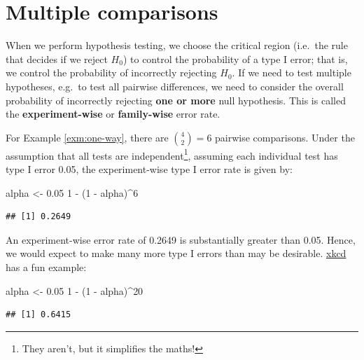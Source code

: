 \documentclass[
]{book}
\newenvironment{Shaded}{\begin{snugshade}}{\end{snugshade}}
\newcommand{\DecValTok}[1]{\textcolor[rgb]{0.00,0.00,0.81}{#1}}
\newcommand{\FloatTok}[1]{\textcolor[rgb]{0.00,0.00,0.81}{#1}}
\newcommand{\NormalTok}[1]{#1}
\newcommand{\OtherTok}[1]{\textcolor[rgb]{0.56,0.35,0.01}{#1}}
\newcommand{\SpecialCharTok}[1]{\textcolor[rgb]{0.00,0.00,0.00}{#1}}
\theoremstyle{definition}
\theoremstyle{definition}
\theoremstyle{definition}
\theoremstyle{definition}
\theoremstyle{remark}
\begin{document}
\hypertarget{multiple-comp}{%
\section{Multiple comparisons}\label{multiple-comp}}

When we perform hypothesis testing, we choose the critical region (i.e.~the rule that decides if we reject \(H_0\)) to control the probability of a type I error; that is, we control the probability of incorrectly rejecting \(H_0\). If we need to test multiple hypotheses, e.g.~to test all pairwise differences, we need to consider the overall probability of incorrectly rejecting \textbf{one or more} null hypothesis. This is called the \textbf{experiment-wise} or \textbf{family-wise} error rate.

For Example \ref{exm:one-way}, there are \({4 \choose 2} = 6\) pairwise comparisons. Under the assumption that all tests are independent\footnote{They aren't, but it simplifies the maths!}, assuming each individual test has type I error 0.05, the experiment-wise type I error rate is given by:

\begin{Shaded}
\begin{Highlighting}[]
\NormalTok{alpha }\OtherTok{\textless{}{-}} \FloatTok{0.05}
\DecValTok{1} \SpecialCharTok{{-}}\NormalTok{ (}\DecValTok{1} \SpecialCharTok{{-}}\NormalTok{ alpha)}\SpecialCharTok{\^{}}\DecValTok{6}
\end{Highlighting}
\end{Shaded}

\begin{verbatim}
## [1] 0.2649
\end{verbatim}

An experiment-wise error rate of 0.2649 is substantially greater than 0.05. Hence, we would expect to make many more type I errors than may be desirable. \href{https://xkcd.com/882}{xkcd} has a fun example:

\begin{Shaded}
\begin{Highlighting}[]
\NormalTok{alpha }\OtherTok{\textless{}{-}} \FloatTok{0.05}
\DecValTok{1} \SpecialCharTok{{-}}\NormalTok{ (}\DecValTok{1} \SpecialCharTok{{-}}\NormalTok{ alpha)}\SpecialCharTok{\^{}}\DecValTok{20}
\end{Highlighting}
\end{Shaded}

\begin{verbatim}
## [1] 0.6415
\end{verbatim}
\end{document}
